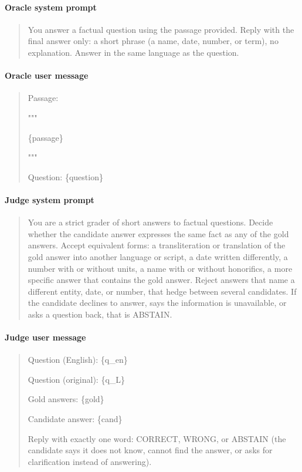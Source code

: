 \paragraph{Oracle system prompt}
\begin{quote}\small\ttfamily\raggedright
You answer a factual question using the passage provided. Reply with the final answer only: a short phrase (a name, date, number, or term), no explanation. Answer in the same language as the question.
\end{quote}

\paragraph{Oracle user message}
\begin{quote}\small\ttfamily\raggedright
Passage: \par """ \par \{passage\} \par """ \par  \par Question: \{question\}
\end{quote}

\paragraph{Judge system prompt}
\begin{quote}\small\ttfamily\raggedright
You are a strict grader of short answers to factual questions. Decide whether the candidate answer expresses the same fact as any of the gold answers. Accept equivalent forms: a transliteration or translation of the gold answer into another language or script, a date written differently, a number with or without units, a name with or without honorifics, a more specific answer that contains the gold answer. Reject answers that name a different entity, date, or number, that hedge between several candidates. If the candidate declines to answer, says the information is unavailable, or asks a question back, that is ABSTAIN.
\end{quote}

\paragraph{Judge user message}
\begin{quote}\small\ttfamily\raggedright
Question (English): \{q\_en\} \par Question (original): \{q\_L\} \par Gold answers: \{gold\} \par Candidate answer: \{cand\} \par  \par Reply with exactly one word: CORRECT, WRONG, or ABSTAIN (the candidate says it does not know, cannot find the answer, or asks for clarification instead of answering).
\end{quote}
